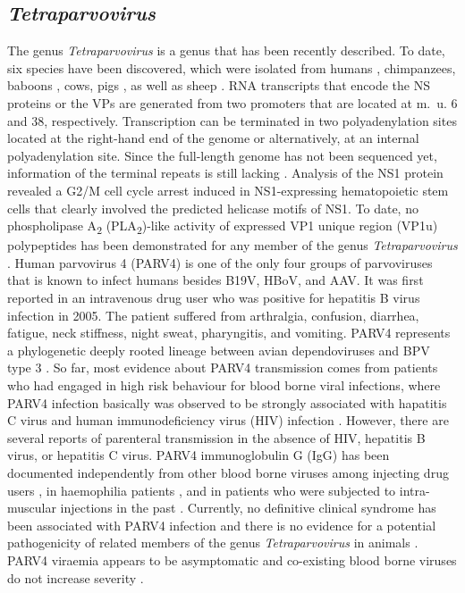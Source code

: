 \subsection{\textit{Tetraparvovirus}}
The genus \textit{Tetraparvovirus} is a genus that has been recently described. To date, six species have been discovered, which were isolated from humans \cite{pmid15956568}, chimpanzees, baboons \cite{pmid20668071}, cows, pigs \cite{pmid18632954, pmid20653980, pmid22247522}, as well as sheep \cite{pmid21980506}. RNA transcripts that encode the NS proteins or the VPs are generated from two promoters that are located at m.~u. 6 and 38, respectively. Transcription can be terminated in two polyadenylation sites located at the right-hand end of the genome or alternatively, at an internal polyadenylation site. Since the full-length genome has not been sequenced yet, information of the terminal repeats is still lacking \cite{pmid22044541}. Analysis of the NS1 protein revealed a G2/M cell cycle arrest induced in NS1-expressing hematopoietic stem cells that clearly involved the predicted helicase motifs \cite{pmid8106366, pmid9261429, pmid7966641} of NS1. To date, no phospholipase A\textsubscript{2} (PLA\textsubscript{2})-like activity of expressed VP1 unique region (VP1u) polypeptides has been demonstrated for any member of the genus \textit{Tetraparvovirus} \cite{pmid22044541}. Human parvovirus 4 (PARV4) is one of the only four groups of parvoviruses that is known to infect humans besides B19V, HBoV, and AAV. It was first reported in an intravenous drug user who was positive for hepatitis B virus infection in 2005. The patient suffered from arthralgia, confusion, diarrhea, fatigue, neck stiffness, night sweat, pharyngitis, and vomiting. PARV4 represents a phylogenetic deeply rooted lineage between avian dependoviruses and BPV type 3 \cite{pmid15956568}. So far, most evidence about PARV4 transmission comes from patients who had engaged in high risk behaviour for blood borne viral infections, where PARV4 infection basically was observed to be strongly associated with hapatitis C virus and human immunodeficiency
virus (HIV) infection \cite{pmid22492853, pmid22235298, pmid17397006}. However, there are several reports of parenteral transmission in the absence of HIV, hepatitis B virus, or hepatitis C virus. PARV4 immunoglobulin G (IgG) has been documented independently from other blood borne viruses among injecting drug users \cite{pmid23283958}, in haemophilia patients \cite{pmid22043925}, and in patients who were subjected to intra-muscular injections in the past \cite{pmid22469425}. Currently, no definitive clinical syndrome has been associated with PARV4 infection and there is no evidence for a potential pathogenicity of related members of the genus \textit{Tetraparvovirus} in animals \cite{pmid18632954}. PARV4 viraemia appears to be asymptomatic \cite{pmid20587191} and co-existing blood borne viruses do not increase severity \cite{pmid22235298}.   

